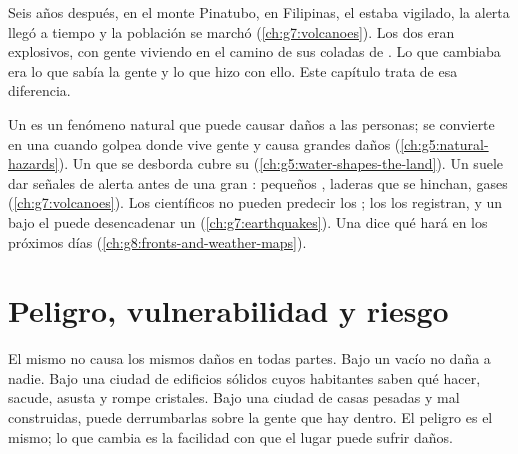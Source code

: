 Seis años después, en el monte Pinatubo, en Filipinas, el  estaba
vigilado, la alerta llegó a tiempo y la población se marchó
(\cref{ch:g7:volcanoes}). Los dos eran  explosivos, con gente
viviendo en el camino de sus coladas de . Lo que cambiaba era lo que
sabía la gente y lo que hizo con ello. Este capítulo trata de esa
diferencia.

\begin{recall}
Un \emph{} es un fenómeno natural que puede causar daños a
las personas; se convierte en una \emph{} cuando golpea
donde vive gente y causa grandes daños (\cref{ch:g5:natural-hazards}). Un
 que se desborda cubre su 
(\cref{ch:g5:water-shapes-the-land}). Un  suele dar señales de alerta
antes de una gran : pequeños , laderas que se hinchan,
gases (\cref{ch:g7:volcanoes}). Los científicos no pueden predecir los
; los  los registran, y un  bajo el 
puede desencadenar un  (\cref{ch:g7:earthquakes}). Una  dice qué  hará en los próximos días
(\cref{ch:g8:fronts-and-weather-maps}).
\end{recall}

\section{Peligro, vulnerabilidad y riesgo}

El mismo  no causa los mismos daños en todas partes. Bajo un
 vacío no daña a nadie. Bajo una ciudad de edificios sólidos cuyos
habitantes saben qué hacer, sacude, asusta y rompe cristales. Bajo una
ciudad de casas pesadas y mal construidas, puede derrumbarlas sobre la
gente que hay dentro. El peligro es el mismo; lo que cambia es la
facilidad con que el lugar puede sufrir daños.

